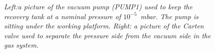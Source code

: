 \begin{figure}[hpt!]
    \bigskip
    \begin{center}\leavevmode
        \caption{\textit{Left:a picture of the vacuum pump (PUMP1) used to keep the recovery tank at a 
        nominal pressure of $10^{-5}$~mbar. The pump is sitting under the working platform. Right: a picture of
        the Carten valve used to separate the pressure side from the vacuum side in the gas system.}}
        \label{fig.P1}
    \end{center}
\end{figure}


